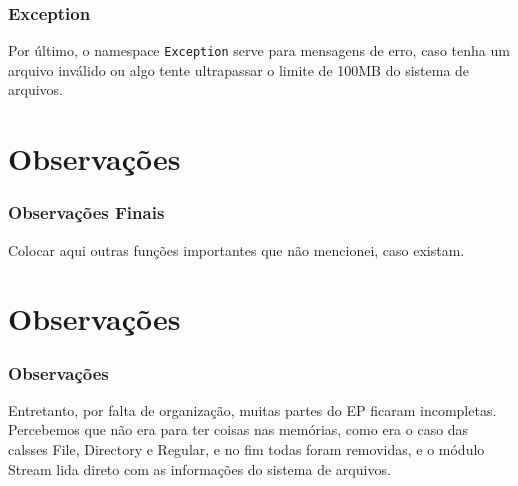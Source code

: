 \documentclass{beamer}
\begin{document}
\begin{frame}
  \frametitle{Exception}
  Por último, o namespace \texttt{Exception} serve para mensagens de erro, caso tenha um arquivo inválido ou algo tente ultrapassar o limite de 100MB do sistema de arquivos.
\end{frame}

\section{Observações}

\begin{frame}
  \frametitle{Observações Finais}
  Colocar aqui outras funções importantes que não mencionei, caso existam.
\end{frame}

\section{Observações}

\begin{frame}
  \frametitle{Observações}
  Entretanto, por falta de organização, muitas partes do EP ficaram incompletas. Percebemos que não era para ter coisas nas memórias, como
  era o caso das calsses File, Directory e Regular, e no fim todas foram removidas, e o módulo Stream lida direto com as informações do sistema de arquivos.
\end{frame}

\end{document}
